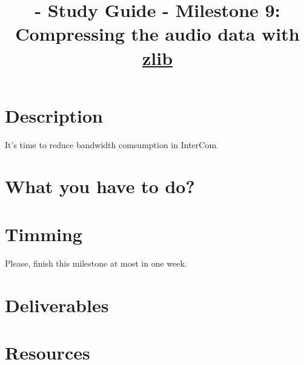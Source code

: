 
\title{\TM{} - Study Guide - Milestone 9: Compressing the audio data with \href{https://zlib.net/}{zlib}}

\maketitle

\section{Description}

It's time to reduce bandwidth comsumption in InterCom. 
\section{What you have to do?}

\section{Timming}

Please, finish this milestone at most in one week.

\section{Deliverables}



\section{Resources}


